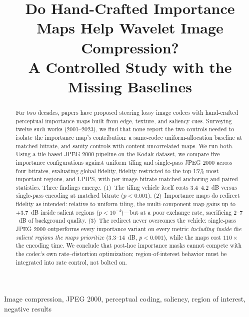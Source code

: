 \documentclass[conference]{IEEEtran}
\begin{document}
\title{Do Hand-Crafted Importance Maps Help Wavelet Image Compression?\\
A Controlled Study with the Missing Baselines}

\author{
}

\maketitle

\begin{abstract}
For two decades, papers have proposed steering lossy image codecs with
hand-crafted perceptual importance maps built from edge, texture, and
saliency cues. Surveying twelve such works (2001--2023), we find that none
report the two controls needed to isolate the importance map's contribution:
a same-codec uniform-allocation baseline at matched bitrate, and sanity
controls with content-uncorrelated maps. We run both. Using a tile-based
JPEG 2000 pipeline on the Kodak dataset, we compare five importance
configurations against uniform tiling and single-pass JPEG 2000 across four
bitrates, evaluating global fidelity, fidelity restricted to the top-15\%
most-important regions, and LPIPS, with per-image bitrate-matched anchoring
and paired statistics. Three findings emerge. (1)~The tiling vehicle itself
costs $3.4$--$4.2$~dB versus single-pass encoding at matched bitrate
($p<0.001$). (2)~Importance maps do redirect fidelity as intended: relative
to uniform tiling, the multi-component map gains up to $+3.7$~dB inside
salient regions ($p<10^{-4}$)---but at a poor exchange rate, sacrificing
$2$--$7$~dB of background quality. (3)~The redirect never overcomes the
vehicle: single-pass JPEG 2000 outperforms every importance variant on every
metric \emph{including inside the salient regions the maps prioritize}
($3.3$--$14$~dB, $p<0.001$), while the maps cost $110\times$ the encoding
time. We conclude that post-hoc importance masks cannot compete with the
codec's own rate--distortion optimization; region-of-interest behavior must
be integrated into rate control, not bolted on.
\end{abstract}

\begin{IEEEkeywords}
Image compression, JPEG 2000, perceptual coding, saliency, region of interest, negative results
\end{IEEEkeywords}
\end{document}
